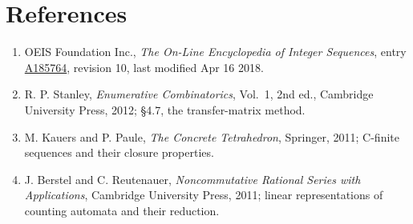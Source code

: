\documentclass[11pt]{article}
\theoremstyle{definition}
\begin{document}
\section{References}

\begin{enumerate}

\item OEIS Foundation Inc., \emph{The On-Line Encyclopedia of Integer Sequences}, entry \href{https://oeis.org/A185764}{A185764}, revision 10, last modified Apr 16 2018.

\item R. P. Stanley, \emph{Enumerative Combinatorics}, Vol.~1, 2nd ed., Cambridge University Press, 2012; \S4.7, the transfer-matrix method.

\item M. Kauers and P. Paule, \emph{The Concrete Tetrahedron}, Springer, 2011; C-finite sequences and their closure properties.

\item J. Berstel and C. Reutenauer, \emph{Noncommutative Rational Series with Applications}, Cambridge University Press, 2011; linear representations of counting automata and their reduction.

\end{enumerate}
\end{document}
